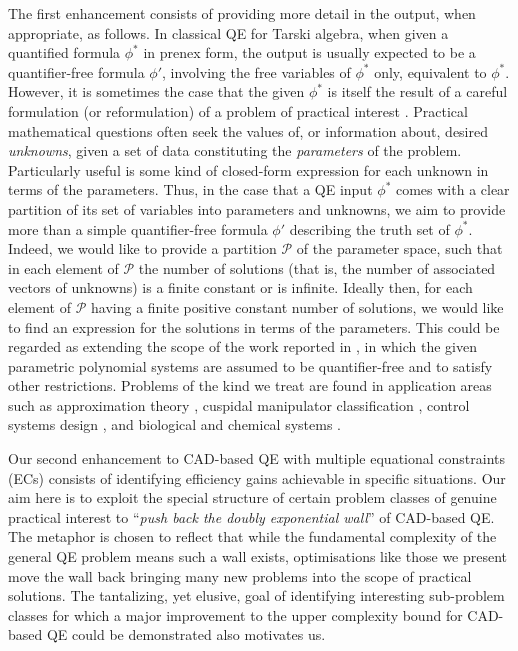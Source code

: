 \documentclass{article}
\begin{document}
The first enhancement consists of providing more detail in the output, when appropriate, as follows. In classical QE for Tarski algebra, when given a quantified formula $\phi^*$ in prenex form, the output is usually expected to be a quantifier-free formula $\phi'$, involving the free variables of $\phi^*$ only, equivalent to $\phi^*$. However, it is sometimes the case that the given $\phi^*$ is itself the result of a careful formulation (or reformulation) of a problem of practical interest \cite{Collins1996, Jirstrand1997}. Practical mathematical questions often seek the values of, or information about, desired {\em unknowns}, given a set of data constituting the {\em parameters} of the problem. Particularly useful is some kind of closed-form expression for each unknown in terms of the parameters. Thus, in the case that a QE input $\phi^*$ comes with a clear partition of its set of variables into parameters and unknowns, we aim to provide more than a simple quantifier-free formula $\phi'$ describing the truth set of $\phi^*$. Indeed, we would like to provide a partition $\mathcal{P}$ of the 
parameter space, such that in each element of $\mathcal{P}$ the number 
of solutions (that is, the number of associated vectors
of unknowns) is a finite constant or is infinite. Ideally then, for 
each element of $\mathcal{P}$ having a finite positive constant number 
of solutions, we would like to find an expression for the solutions in 
terms of the parameters. This could be regarded as extending the scope 
of the work reported in \cite{LR07}, in which the given parametric 
polynomial systems are assumed to be quantifier-free and to satisfy 
other restrictions. Problems of the kind we treat are found in 
application areas such as 
approximation theory \cite{Collins1996}, 
cuspidal manipulator classification \cite{LR07}, 
control systems design \cite{Jirstrand1997}, 
and biological and chemical systems \cite{SE2022}.

Our second enhancement to CAD-based QE with multiple equational constraints (ECs) consists of identifying efficiency gains achievable in specific situations. Our aim here is to exploit the special structure of certain problem classes of genuine practical interest to ``\emph{push back the doubly exponential wall}'' of CAD-based QE. The metaphor is chosen to reflect that while the fundamental complexity of the general QE problem means such a wall exists, optimisations like those we present move the wall back bringing many new problems into the scope of practical solutions. The tantalizing, yet elusive, goal of identifying interesting sub-problem classes for which a major improvement to the upper complexity bound for CAD-based QE could be demonstrated also motivates us.
\end{document}
